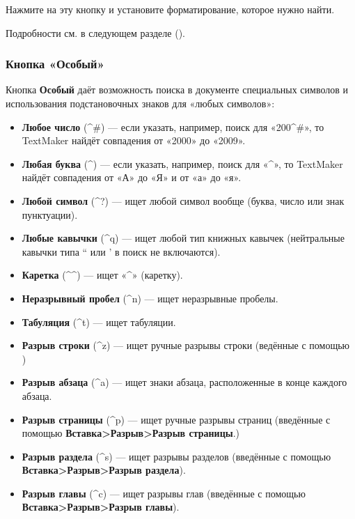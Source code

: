 ﻿\documentclass[a4paper,10pt]{article}
\begin{document}
Нажмите на эту кнопку и установите форматирование, которое нужно найти.

Подробности см. в следующем разделе ().

\subsubsection{Кнопка «Особый»}
Кнопка \textbf{Особый} даёт возможность поиска в документе специальных символов и использования подстановочных знаков для «любых символов»:
\begin{itemize}
 \item \textbf{Любое число} (\textasciicircum\#) — если указать, например, поиск для «200\textasciicircum\#», то TextMaker найдёт совпадения от «2000» до «2009».
 \item \textbf{Любая буква} (\textasciicircum \textdollar) — если указать, например, поиск для «\textasciicircum \textdollar», то TextMaker найдёт совпадения от «А» до «Я» и от «а» до «я».
 \item \textbf{Любой символ} (\textasciicircum?) — ищет любой символ вообще (буква, число или знак пунктуации).
 \item \textbf{Любые кавычки} (\textasciicircum q) — ищет любой тип книжных кавычек (нейтральные кавычки типа `` или ' в поиск не включаются).
 \item \textbf{Каретка} (\textasciicircum\textasciicircum) — ищет «\textasciicircum» (каретку).
 \item \textbf{Неразрывный пробел} (\textasciicircum n) — ищет неразрывные пробелы.
 \item \textbf{Табуляция} (\textasciicircum t) — ищет табуляции.
 \item \textbf{Разрыв строки} (\textasciicircum z) — ищет ручные разрывы строки (ведённые с помощью )
 \item \textbf{Разрыв абзаца} (\textasciicircum a) — ищет знаки абзаца, расположенные в конце каждого абзаца.
 \item \textbf{Разрыв страницы} (\textasciicircum p) — ищет ручные разрывы страниц (введённые с помощью \textbf{Вставка>Разрыв>Разрыв страницы}.)
 \item \textbf{Разрыв раздела} (\textasciicircum s) — ищет разрывы разделов (введённые с помощью \textbf{Вставка>Разрыв>Разрыв раздела}).
 \item \textbf{Разрыв главы} (\textasciicircum c) — ищет разрывы глав (введённые с помощью \textbf{Вставка>Разрыв>Разрыв главы}).
\end{itemize}
\end{document}
